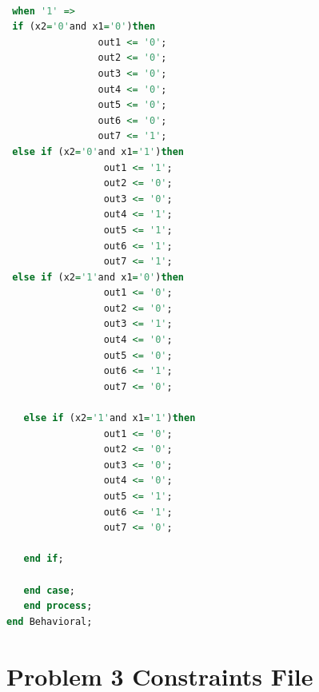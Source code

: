 \documentclass[11pt]{article}
\begin{document}
\begin{appendices}
\begin{lstlisting}[language=VHDL]
                 
 when '1' =>   
 if (x2='0'and x1='0')then
                out1 <= '0';
                out2 <= '0';
                out3 <= '0';
                out4 <= '0';
                out5 <= '0';
                out6 <= '0';
                out7 <= '1';  
 else if (x2='0'and x1='1')then
                 out1 <= '1';
                 out2 <= '0';
                 out3 <= '0';
                 out4 <= '1';
                 out5 <= '1';
                 out6 <= '1';
                 out7 <= '1'; 
 else if (x2='1'and x1='0')then           
                 out1 <= '0';
                 out2 <= '0';
                 out3 <= '1';
                 out4 <= '0';
                 out5 <= '0';
                 out6 <= '1';
                 out7 <= '0'; 
                                 
   else if (x2='1'and x1='1')then   
                 out1 <= '0';
                 out2 <= '0';
                 out3 <= '0';
                 out4 <= '0';
                 out5 <= '1';
                 out6 <= '1';
                 out7 <= '0';  
                 
   end if;                                   
                             
   end case;
   end process;              
end Behavioral;

\end{lstlisting}

\section{Problem 3 Constraints File}

\end{appendices}
\end{document}
